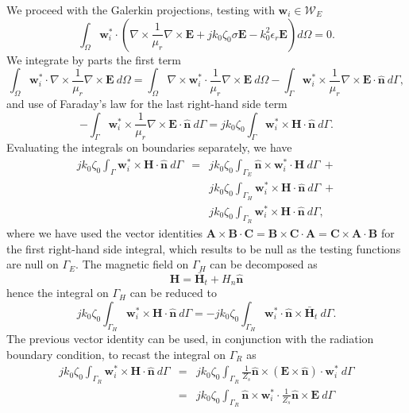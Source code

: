 We proceed with the Galerkin projections, testing with $\mathbf{w}_i \in \mathcal{W}_E$
$$ \int_\Omega \mathbf{w}_i^* \cdot \left ( \nabla \times \frac{1}{\mu_r} \nabla \times {\mathbf{E}} + j k_0 \zeta_0 \sigma {\mathbf{E}} - k_0^2 \epsilon_r {\mathbf{E}} \right) d\Omega =  0. $$
\noindent We integrate by parts the first term 
\begin{equation}
\label{eq:weakform}
\int_\Omega \mathbf{w}_i^* \cdot \nabla \times \frac{1}{\mu_r} \nabla \times {\mathbf{E}} \ d\Omega = \int_\Omega \nabla \times \mathbf{w}_i^* \cdot \frac{1}{\mu_r} \nabla \times {\mathbf{E}} \ d\Omega - \int_\Gamma \mathbf{w}_i^*  \times \frac{1}{\mu_r} \nabla \times {\mathbf{E}} \cdot \hat{\mathbf{n}} \ d\Gamma,
\end{equation}
\noindent and use of Faraday's law for the last right-hand side term
$$  - \int_\Gamma \mathbf{w}_i^*  \times \frac{1}{\mu_r} \nabla \times {\mathbf{E}} \cdot \hat{\mathbf{n}} \ d\Gamma = jk_0\zeta_0 \int_\Gamma \mathbf{w}_i^* \times \mathbf{H} \cdot \hat{\mathbf{n}} \ d\Gamma.$$
\noindent Evaluating the integrals on boundaries separately, we have
%
\begin{eqnarray}
\label{eq:Gamma}
jk_0\zeta_0 \int_\Gamma \mathbf{w}_i^*  \times \mathbf{H} \cdot \hat{\mathbf{n}} \ d\Gamma & = & jk_0\zeta_0 \int_{\Gamma_E} \hat{\mathbf{n}} \times \mathbf{w}_i^* \cdot \mathbf{H} \ d\Gamma \ + \nonumber \\
& & jk_0\zeta_0 \int_{\Gamma_H} \mathbf{w}_i^*  \times \mathbf{H} \cdot \hat{\mathbf{n}} \ d\Gamma \ + \nonumber \\
& & jk_0\zeta_0 \int_{\Gamma_R} \mathbf{w}_i^*  \times \mathbf{H} \cdot \hat{\mathbf{n}} \ d\Gamma,
\end{eqnarray}
%
\noindent where we have used the vector identities $\mathbf{A}\times\mathbf{B}\cdot\mathbf{C} = \mathbf{B}\times\mathbf{C}\cdot\mathbf{A} = \mathbf{C}\times\mathbf{A}\cdot\mathbf{B}$ for the first right-hand side integral, which results to be null as the testing functions are null on $\Gamma_E$. The magnetic field on $\Gamma_H$ can be decomposed as
$$\mathbf{H} = \bar{\mathbf{H}}_t + H_n \hat{\mathbf{n}} $$
\noindent hence the integral on $\Gamma_H$ can be reduced to
$$jk_0\zeta_0 \int_{\Gamma_H} \mathbf{w}_i^*  \times \mathbf{H} \cdot \hat{\mathbf{n}} \ d\Gamma = -jk_0\zeta_0 \int_{\Gamma_H} \mathbf{w}_i^*  \cdot \hat{\mathbf{n}} \times \bar{\mathbf{H}}_t \ d\Gamma.$$
\noindent The previous vector identity can be used, in conjunction with the radiation boundary condition, to recast the integral on $\Gamma_R$ as
\begin{eqnarray*}
jk_0\zeta_0 \int_{\Gamma_R} \mathbf{w}_i^*  \times \mathbf{H} \cdot \hat{\mathbf{n}} \ d\Gamma &= & jk_0\zeta_0 \int_{\Gamma_R} \frac{1}{Z_s}\hat{\mathbf{n}} \times (\mathbf{E} \times \hat{\mathbf{n}}) \cdot \mathbf{w}_i^* \ d\Gamma\\
&=& jk_0\zeta_0 \int_{\Gamma_R} \hat{\mathbf{n}} \times \mathbf{w}_i^* \cdot \frac{1}{Z_s}\hat{\mathbf{n}} \times \mathbf{E} \ d\Gamma
\end{eqnarray*}
